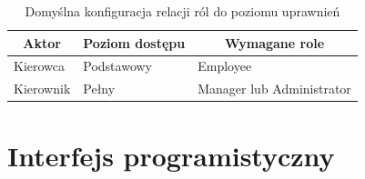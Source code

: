 \documentclass[eng,printmode,openany]{mgr}
\begin{document}
	\begin{table}[H]
		\caption{Domyślna konfiguracja relacji ról do poziomu uprawnień}
		\begin{tabularx}{\textwidth}{|l|l|X|}
			\hline
			\multicolumn{1}{|c|}{\textbf{Aktor}} & \multicolumn{1}{c|}{\textbf{Poziom dostępu}} & \multicolumn{1}{c|}{\textbf{Wymagane role}} \\ \hline
			Kierowca                             & Podstawowy                                   & Employee                                    \\ \hline
			Kierownik                            & Pełny                                        & Manager lub Administrator                   \\ \hline
		\end{tabularx}
	\end{table}
	
	\newpage
	\section{Interfejs programistyczny}
\end{document}
